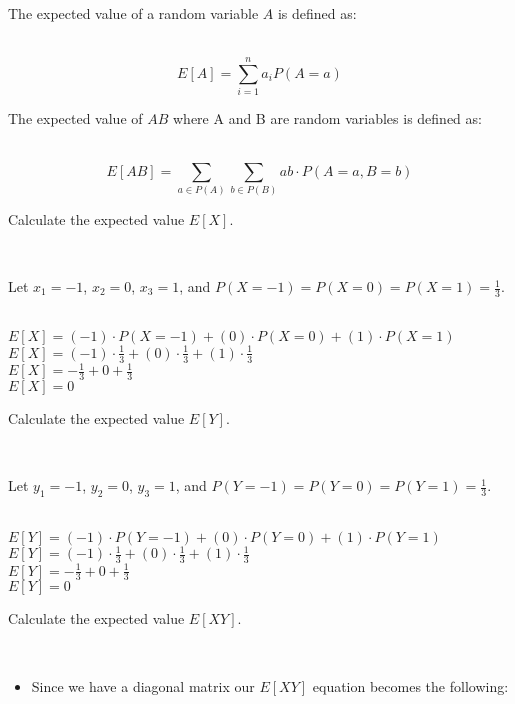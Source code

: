\documentclass{article}
\begin{document}
\parbox{\textwidth}{The expected value of a random variable $A$ is defined as:}\\

$$E[A] = \sum^{n}_{i=1} a_i P(A=a)$$

\parbox{\textwidth}{The expected value of $AB$  where A and B are random variables is defined as:}\\

$$E[AB] = \sum_{a \in P(A)} \sum_{b \in P(B)} ab \cdot P(A = a, B = b)$$

\parbox{\textwidth}{Calculate the expected value $E[X]$.}\\

\parbox{\textwidth}{Let $x_1 = -1$, $x_2 = 0$, $x_3 = 1$, and $P(X=-1) = P(X=0) = P(X=1) = \frac{1}{3}$.}\\

$E[X] = (-1) \cdot P(X = -1) + (0) \cdot P(X = 0) + (1) \cdot P(X = 1)$\\

$E[X] = (-1) \cdot \frac{1}{3} + (0) \cdot \frac{1}{3} + (1) \cdot \frac{1}{3}$\\

$E[X] = -\frac{1}{3} + 0 + \frac{1}{3}$\\

$E[X] = 0$\\

\parbox{\textwidth}{Calculate the expected value $E[Y]$.}\\

\parbox{\textwidth}{Let $y_1 = -1$, $y_2 = 0$, $y_3 = 1$, and $P(Y=-1) = P(Y=0) = P(Y=1) = \frac{1}{3}$.}\\

$E[Y] = (-1) \cdot P(Y = -1) + (0) \cdot P(Y = 0) + (1) \cdot P(Y = 1)$\\

$E[Y] = (-1) \cdot \frac{1}{3} + (0) \cdot \frac{1}{3} + (1) \cdot \frac{1}{3}$\\

$E[Y] = -\frac{1}{3} + 0 + \frac{1}{3}$\\

$E[Y] = 0$\\

\parbox{\textwidth}{Calculate the expected value $E[XY]$.}\\

\begin{itemize}
    \item \parbox{\textwidth}{Since we have a diagonal matrix our $E[XY]$ equation becomes the following:}
\end{itemize}
\end{document}
